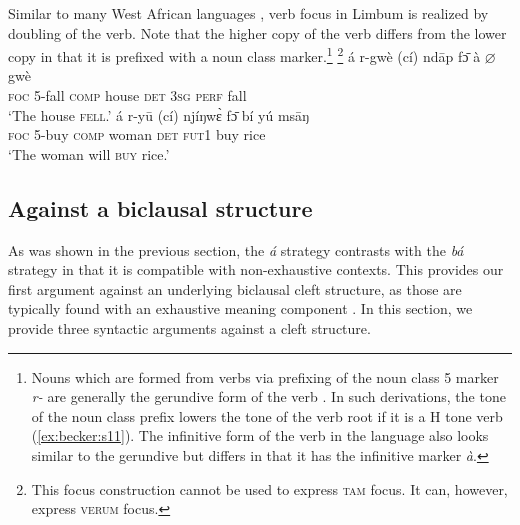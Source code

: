 \documentclass[output=paper,
modfonts
]{langscibook}
\begin{document}
Similar to many West African languages \citep{Koopman1984,Ameka1992,Manfredi1997,Biloa1997,Aboh1998,Aboh2006}, verb focus in Limbum is realized by doubling of the verb. Note that the higher copy of the verb differs from the lower copy in that it is prefixed with a noun class marker.\footnote{Nouns which are formed from verbs via prefixing of the noun class 5 marker \textit{r-} are generally the gerundive form of the verb \citep{Nformi2017}. In such derivations, the tone of the noun class prefix lowers the tone of the verb root if it is a H tone verb (\ref{ex:becker:s11}). The infinitive form of the verb in the language also looks similar to the gerundive but differs in that it has the infinitive marker \textit{\`a}.}
\footnote{This focus construction cannot be used to express \textsc{tam} focus. It can, however, express \textsc{verum} focus.}
\settowidth{}
\ea \label{ex:becker:s10}
\gll \'a {r-gw\`e} (c\'i) nd\=ap f\=ɔ \`a $\varnothing$ {gw\`e}\\  
     \textsc{foc} {\textsc{5}-fall} \textsc{comp} house \textsc{det}  \textsc{3sg} \textsc{perf} {fall}\\ 
\glt `The house \textsc{\MakeLowercase{FELL}}.'
\ex \label{ex:becker:s11}
\gll \'a {r-y\=u} (c\'i) nj\'iŋw\`ɛ f\=ɔ b\'i {y\'u} ms\=aŋ\\  
     \textsc{foc} {\textsc{5}-buy} \textsc{comp} woman \textsc{det} \textsc{fut1} {buy} rice\\ 
\glt `The woman will \textsc{\MakeLowercase{BUY}} rice.'
\z \z


\subsection{Against a biclausal structure}
As was shown in the previous section, the \textit{\'a} strategy contrasts with the \textit{b\'a} strategy in that it is compatible with non-exhaustive contexts. This provides our first argument against an underlying biclausal cleft structure, as those are typically found with an exhaustive meaning component \citep{Horn1981,Percus1997}. In this section, we provide three syntactic arguments against a cleft structure. 
\end{document}
